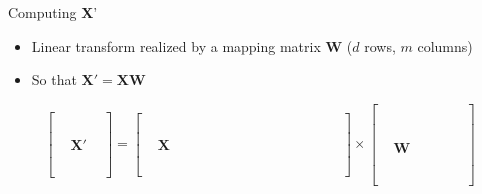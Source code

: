 \documentclass[aspectratio=169]{beamer}
\begin{document}
\begin{frame}{Computing \textbf{X}'}

\begin{itemize}
		\item Linear transform realized by a mapping matrix $\textbf{W}$ ($d$ rows, $m$ columns)
		\item So that $\textbf{X}' = \textbf{X} \textbf{W}$
\end{itemize}
\[
\begin{bmatrix} 
	 &   & 	\\
	 &   & 	\\
	 &   & 	\\
	 &   & 	\\
	 & \textbf{X}' & 	\\
	 &  & 	\\
	 &  & 	\\
	 & & 	\\
\end{bmatrix} 
= \begin{bmatrix} 
	&\hspace{12em}  & 	\\
	&  & 	\\
	&  & 	\\
	&  & 	\\
	&\textbf{X} & 	\\
	&  & 	\\
	&  & 	\\
	&  & 	\\
\end{bmatrix} 
\times
 \begin{bmatrix} 
	 &  \hspace{4em}& 	\\
	&  & 	\\
	  &  &\\
	  &  &\\
	  &  &\\
	  &  &\\
	  & \textbf{W} &\\
	  &  &\\
	  &  &\\
	  &  &\\
	  &  &\\
	  &  & 
\end{bmatrix} 
\]
\end{frame}
\end{document}
